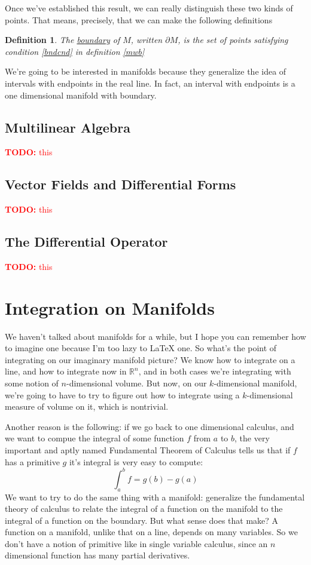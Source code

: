 \documentclass{article}
\newtheorem{definition}{Definition}
\newcommand{\reals}[0]{\mathbb{R}}
\newcommand{\TODO}[1]{\textcolor{red}{\textbf{TODO:} #1}}
\begin{document}
Once we've established this result, we can really distinguish these two kinds of points. That means, precisely, that we can make the following definitions
\begin{definition}
  The \underline{boundary} of \(M\), written \(\partial M\), is the set of points satisfying condition \ref{bndcnd} in definition \ref{mwb}
\end{definition}

We're going to be interested in manifolds because they generalize the idea of intervals with endpoints in the real line. In fact, an interval with endpoints is a one dimensional manifold with boundary.


\subsection{Multilinear Algebra}

\TODO{this}

\subsection{Vector Fields and Differential Forms}

\TODO{this}

\subsection{The Differential Operator}

\TODO{this}

\section{Integration on Manifolds}

We haven't talked about manifolds for a while, but I hope you can remember how to imagine one because I'm too lazy to {\LaTeX} one. So what's the point of integrating on our imaginary manifold picture? We know how to integrate on a line, and how to integrate now in \(\reals^n\), and in both cases we're integrating with some notion of \(n\)-dimensional volume. But now, on our \(k\)-dimensional manifold, we're going to have to try to figure out how to integrate using a \(k\)-dimensional measure of volume on it, which is nontrivial.

Another reason is the following: if we go back to one dimensional calculus, and we want to compue the integral of some function \(f\) from \(a\) to \(b\), the very important and aptly named Fundamental Theorem of Calculus tells us that if \(f\) has a primitive \(g\) it's integral is very easy to compute:
\begin{equation}
  \int_a^bf = g(b) - g(a)
\end{equation}
We want to try to do the same thing with a manifold: generalize the fundamental theory of calculus to relate the integral of a function on the manifold to the integral of a function on the boundary. But what sense does that make? A function on a manifold, unlike that on a line, depends on many variables. So we don't have a notion of primitive like in single variable calculus, since an \(n\) dimensional function has many partial derivatives.
\end{document}
